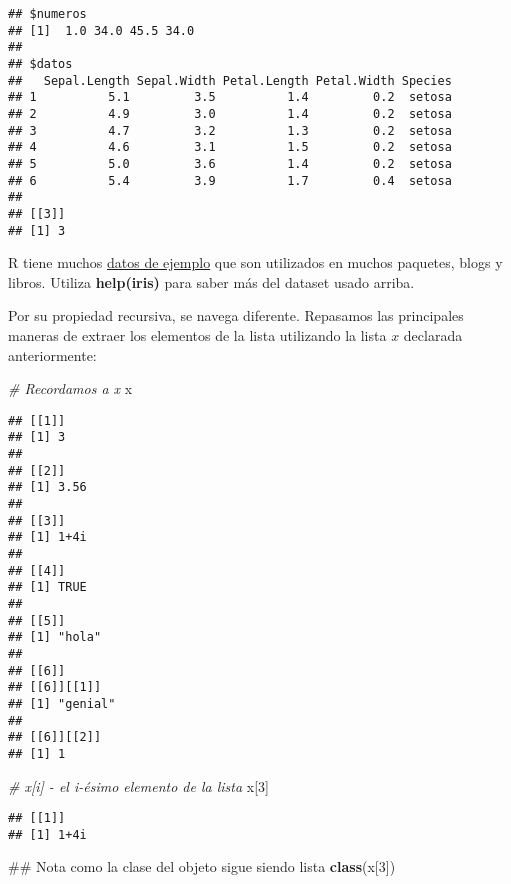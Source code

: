 \documentclass[]{article}
\newenvironment{Shaded}{\begin{snugshade}}{\end{snugshade}}
\newcommand{\KeywordTok}[1]{\textcolor[rgb]{0.13,0.29,0.53}{\textbf{#1}}}
\newcommand{\DecValTok}[1]{\textcolor[rgb]{0.00,0.00,0.81}{#1}}
\newcommand{\CommentTok}[1]{\textcolor[rgb]{0.56,0.35,0.01}{\textit{#1}}}
\newcommand{\NormalTok}[1]{#1}
\begin{document}
\begin{verbatim}
## $numeros
## [1]  1.0 34.0 45.5 34.0
## 
## $datos
##   Sepal.Length Sepal.Width Petal.Length Petal.Width Species
## 1          5.1         3.5          1.4         0.2  setosa
## 2          4.9         3.0          1.4         0.2  setosa
## 3          4.7         3.2          1.3         0.2  setosa
## 4          4.6         3.1          1.5         0.2  setosa
## 5          5.0         3.6          1.4         0.2  setosa
## 6          5.4         3.9          1.7         0.4  setosa
## 
## [[3]]
## [1] 3
\end{verbatim}

\begin{curiosidad}
R tiene muchos \href{https://stat.ethz.ch/R-manual/R-devel/library/datasets/html/00Index.html}{datos de ejemplo}
que son utilizados en muchos paquetes, blogs y libros. Utiliza {\bf help(iris)} para
saber más del dataset usado arriba.
\end{curiosidad}

Por su propiedad recursiva, se navega diferente. Repasamos las
principales maneras de extraer los elementos de la lista utilizando la
lista \(x\) declarada anteriormente:

\begin{Shaded}
\begin{Highlighting}[]
\CommentTok{# Recordamos a x}
\NormalTok{x}
\end{Highlighting}
\end{Shaded}

\begin{verbatim}
## [[1]]
## [1] 3
## 
## [[2]]
## [1] 3.56
## 
## [[3]]
## [1] 1+4i
## 
## [[4]]
## [1] TRUE
## 
## [[5]]
## [1] "hola"
## 
## [[6]]
## [[6]][[1]]
## [1] "genial"
## 
## [[6]][[2]]
## [1] 1
\end{verbatim}

\begin{Shaded}
\begin{Highlighting}[]
\CommentTok{# x[i] - el i-ésimo elemento de la lista}
\NormalTok{x[}\DecValTok{3}\NormalTok{]}
\end{Highlighting}
\end{Shaded}

\begin{verbatim}
## [[1]]
## [1] 1+4i
\end{verbatim}

\begin{Shaded}
\begin{Highlighting}[]
\NormalTok{## Nota como la clase del objeto sigue siendo lista}
\KeywordTok{class}\NormalTok{(x[}\DecValTok{3}\NormalTok{])}
\end{Highlighting}
\end{Shaded}
\end{document}
